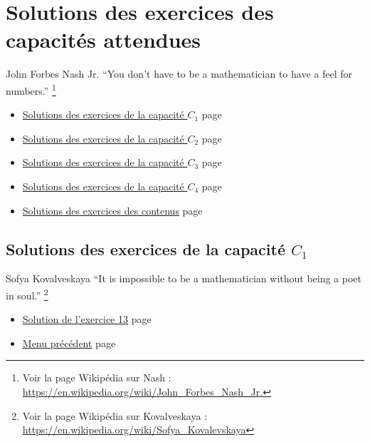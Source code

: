 \documentclass[a4paper,11pt]{book}
\begin{document}
\part{Solutions des exercices des capacités attendues}
\label{sec:orge60ad46}
\label{orgd241bdf}
\label{page:sec9sols-capacities}

\begin{myquote}{John Forbes Nash Jr.}
\enquote{You don’t have to be a mathematician to have a feel for numbers.}
\footnote{Voir la page Wikipédia sur Nash : \url{https://en.wikipedia.org/wiki/John_Forbes_Nash_Jr.}}
\end{myquote}

\clearpage

\label{orgcabe6f1}
\label{page:sols-capacities-menu}
\begin{itemize}
\item \hyperref[orgfab147a]{Solutions des exercices de la capacité \(C_1\)} page
\pageref{page:sec9.1sols-capacity1}
\item \hyperref[org890787c]{Solutions des exercices de la capacité \(C_2\)} page
\pageref{page:sec9.2sols-capacity2}
\item \hyperref[org0574bca]{Solutions des exercices de la capacité \(C_3\)} page
\pageref{page:sec9.3sols-capacity3}
\item \hyperref[orgaa4998d]{Solutions des exercices de la capacité \(C_4\)} page
\pageref{page:sec9.4sols-capacity4}
\item \hyperref[orge8af971]{Solutions des exercices des contenus} page
\pageref{page:sec8sols-contents}
\end{itemize}



\clearpage

\chapter{Solutions des exercices de la capacité \(C_1\)}
\label{sec:org4901d34}
\label{orgfab147a}
\label{page:sec9.1sols-capacity1}

\begin{myquote}{Sofya Kovalveskaya}
\enquote{It is impossible to be a mathematician without being a poet in soul.}
\footnote{Voir la page Wikipédia sur Kovalveskaya : \url{https://en.wikipedia.org/wiki/Sofya_Kovalevskaya}}
\end{myquote}

\label{orga6feabd}
\label{page:sols-capacity1-menu}
\begin{itemize}
\item \hyperref[orgcc6458f]{Solution de l'exercice 13}
page~\pageref{page:sec9.1.1sols13}
\item \hyperref[orgcabe6f1]{Menu précédent}
page~\pageref{page:sols-capacities-menu}
\end{itemize}
\end{document}
